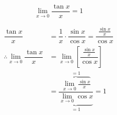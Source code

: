 \documentclass[14pt,fleqn]{extarticle}
\begin{document}
 

\begin{snippet}
    \correct

\[ \lim_{x\to 0}\dfrac{\tan x}{x} = 1 \]    

    
    \reason

\begin{align}
\dfrac{\tan x}{x} &= \dfrac{1}{x}\cdot\dfrac{\sin x}{\cos x} = \dfrac{\frac{\sin x}{x}}{\cos x} \\
\therefore \lim_{x\to 0}\dfrac{\tan x}{x} &= \lim_{x\to 0}\left[ \dfrac{\frac{\sin x}{x}}{\cos x}\right] \\
&= \dfrac{\overbrace{\lim_{x\to 0}\frac{\sin x}{x}}^{=1}}{\underbrace{\lim_{x\to 0}\cos x}_{=1}} = 1
\end{align}
    
\end{snippet} 
\end{document}
